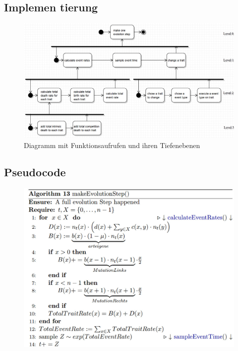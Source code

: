 \documentclass{beamer}
\begin{document}
\subsection{Implemen\- tierung}
\begin{frame}
	\begin{figure}[H]
		\centering
		\includegraphics[width=1\linewidth]{../UMLs/PseudoCodeForBThesis}
		\caption{Diagramm mit Funktionsaufrufen und ihren Tiefenebenen}
	\end{figure}
\end{frame}

\subsection{Pseudocode}
\begin{frame}
	\begin{figure}[H]
		\centering
		\includegraphics[width=1\linewidth]{./Pictures/Alg1}
	\end{figure}
\end{frame}
\end{document}
